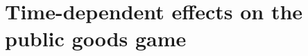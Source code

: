 \chapter{Time-dependent effects on the public goods game} %
\label{chap:TimeEffects}



\section{}





\begin{thebibliography}{04}


\end{thebibliography}






